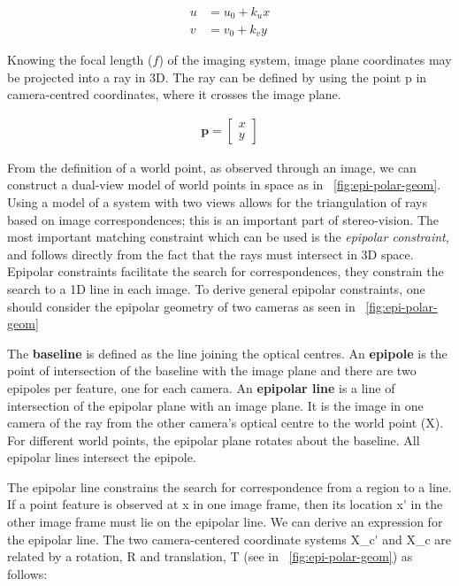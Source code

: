 \documentclass{osa-article}
\begin{document}
\begin{align}
  u & = u_0 + k_u x \\
  v & = v_0 + k_v y
\end{align}

Knowing the focal length (\(f\)) of the imaging system, image plane coordinates may be projected into a ray in 3D.
The ray can be defined by using the point \gls*{p} in camera-centred coordinates, where it crosses the image plane.

\begin{align}
  \mathbf{p} = \begin{bmatrix}
    x \\y
  \end{bmatrix}
\end{align}

From the definition of a world point, as observed through an image, we can construct a dual-view model of world points in space as in \figurename~\ref{fig:epi-polar-geom}.
Using a model of a system with two views allows for the triangulation of rays based on image correspondences; this is an important part of stereo-vision.
The most important matching constraint which can be used is the \emph{epipolar constraint}, and follows directly from the fact that the rays must intersect in 3D space.
Epipolar constraints facilitate the search for correspondences, they constrain the search to a 1D line in each image.
To derive general epipolar constraints, one should consider the epipolar geometry of two cameras as seen in \figurename~\ref{fig:epi-polar-geom}


The \textbf{baseline} is defined as the line joining the optical centres.
An \textbf{epipole} is the point of intersection of the baseline with the image plane and there are two epipoles per feature, one for each camera.
An \textbf{epipolar line} is a line of intersection of the epipolar plane with an image plane.
It is the image in one camera of the ray from the other camera’s optical centre to the world point (\gls*{X}).
For different world points, the epipolar plane rotates about the baseline.
All epipolar lines intersect the epipole.

The epipolar line constrains the search for correspondence from a region to a line.
If a point feature is observed at \gls*{x} in one image frame, then its location \gls*{x'} in the other image frame must lie on the epipolar line.
We can derive an expression for the epipolar line.
The two camera-centered coordinate systems \gls*{X_c'} and \gls*{X_c} are related by a rotation, \gls*{R} and translation, \gls*{T} (see in \figurename~\ref{fig:epi-polar-geom}) as follows:
\end{document}
